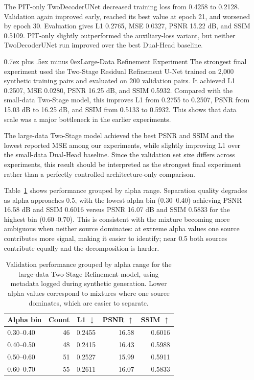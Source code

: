 \documentclass[conference]{IEEEtran}
\makeatletter
\def\subsection{\@startsection{subsection}{2}{\z@}{1.5ex plus 1.5ex minus 0.5ex}%
  {0.7ex plus .5ex minus 0ex}{\normalfont\normalsize\bfseries}}
\makeatother
\begin{document}
The PIT-only TwoDecoderUNet decreased training loss from 0.4258 to 0.2128. Validation again improved early, reached its best value at epoch 21, and worsened by epoch 30. Evaluation gives L1 0.2765, MSE 0.0327, PSNR 15.22 dB, and SSIM 0.5109. PIT-only slightly outperformed the auxiliary-loss variant, but neither TwoDecoderUNet run improved over the best Dual-Head baseline.

\subsection{Large-Data Refinement Experiment}
The strongest final experiment used the Two-Stage Residual Refinement U-Net trained on 2,000 synthetic training pairs and evaluated on 200 validation pairs. It achieved L1 0.2507, MSE 0.0280, PSNR 16.25 dB, and SSIM 0.5932. Compared with the small-data Two-Stage model, this improves L1 from 0.2755 to 0.2507, PSNR from 15.03 dB to 16.25 dB, and SSIM from 0.5133 to 0.5932. This shows that data scale was a major bottleneck in the earlier experiments.

The large-data Two-Stage model achieved the best PSNR and SSIM and the lowest reported MSE among our experiments, while slightly improving L1 over the small-data Dual-Head baseline. Since the validation set size differs across experiments, this result should be interpreted as the strongest final experiment rather than a perfectly controlled architecture-only comparison.

Table~\ref{tab:alpha_bins} shows performance grouped by alpha range. Separation quality degrades as alpha approaches 0.5, with the lowest-alpha bin (0.30--0.40) achieving PSNR 16.58 dB and SSIM 0.6016 versus PSNR 16.07 dB and SSIM 0.5833 for the highest bin (0.60--0.70). This is consistent with the mixture becoming more ambiguous when neither source dominates: at extreme alpha values one source contributes more signal, making it easier to identify; near 0.5 both sources contribute equally and the decomposition is harder.

\begin{table}[t]
\centering
\small
\begin{tabular}{lrrrr}
\toprule
Alpha bin & Count & L1 $\downarrow$ & PSNR $\uparrow$ & SSIM $\uparrow$ \\
\midrule
0.30--0.40 & 46 & 0.2455 & 16.58 & 0.6016 \\
0.40--0.50 & 48 & 0.2415 & 16.43 & 0.5988 \\
0.50--0.60 & 51 & 0.2527 & 15.99 & 0.5911 \\
0.60--0.70 & 55 & 0.2611 & 16.07 & 0.5833 \\
\bottomrule
\end{tabular}
\caption{Validation performance grouped by alpha range for the large-data Two-Stage Refinement model, using metadata logged during synthetic generation. Lower alpha values correspond to mixtures where one source dominates, which are easier to separate.}
\label{tab:alpha_bins}
\end{table}
\end{document}
